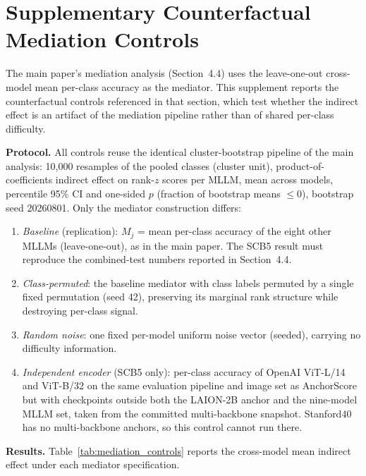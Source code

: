 \documentclass[11pt,a4paper]{article}
\begin{document}
\section*{Supplementary Counterfactual Mediation Controls}
\label{sec:mediation_controls}

The main paper's mediation analysis (Section~4.4) uses the leave-one-out cross-model mean per-class accuracy as the mediator. This supplement reports the counterfactual controls referenced in that section, which test whether the indirect effect is an artifact of the mediation pipeline rather than of shared per-class difficulty.

\textbf{Protocol.} All controls reuse the identical cluster-bootstrap pipeline of the main analysis: 10{,}000 resamples of the pooled classes (cluster unit), product-of-coefficients indirect effect on rank-$z$ scores per MLLM, mean across models, percentile 95\% CI and one-sided $p$ (fraction of bootstrap means $\leq 0$), bootstrap seed 20260801. Only the mediator construction differs:

\begin{enumerate}
  \item \emph{Baseline} (replication): $M_j$ = mean per-class accuracy of the eight other MLLMs (leave-one-out), as in the main paper. The SCB5 result must reproduce the combined-test numbers reported in Section~4.4.
  \item \emph{Class-permuted}: the baseline mediator with class labels permuted by a single fixed permutation (seed 42), preserving its marginal rank structure while destroying per-class signal.
  \item \emph{Random noise}: one fixed per-model uniform noise vector (seeded), carrying no difficulty information.
  \item \emph{Independent encoder} (SCB5 only): per-class accuracy of OpenAI ViT-L/14 and ViT-B/32 on the same evaluation pipeline and image set as AnchorScore but with checkpoints outside both the LAION-2B anchor and the nine-model MLLM set, taken from the committed multi-backbone snapshot. Stanford40 has no multi-backbone anchors, so this control cannot run there.
\end{enumerate}

\textbf{Results.} Table~\ref{tab:mediation_controls} reports the cross-model mean indirect effect under each mediator specification.
\end{document}

